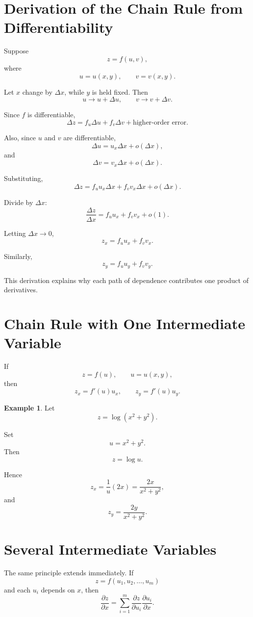 \documentclass[11pt,oneside]{book}
\theoremstyle{studentthm}
\theoremstyle{definition}
\newtheorem{example}[theorem]{Example}
\begin{document}
\section{Derivation of the Chain Rule from Differentiability}

Suppose
\[
z=f(u,v),
\]
where
\[
u=u(x,y),
\qquad
v=v(x,y).
\]

Let \(x\) change by \(\Delta x\), while \(y\) is held fixed. Then
\[
u\to u+\Delta u,
\qquad
v\to v+\Delta v.
\]

Since \(f\) is differentiable,
\[
\Delta z
=
f_u\Delta u
+
f_v\Delta v
+
\text{higher-order error}.
\]

Also, since \(u\) and \(v\) are differentiable,
\[
\Delta u
=
u_x\Delta x
+
o(\Delta x),
\]
and
\[
\Delta v
=
v_x\Delta x
+
o(\Delta x).
\]

Substituting,
\[
\Delta z
=
f_u u_x\Delta x
+
f_v v_x\Delta x
+
o(\Delta x).
\]

Divide by \(\Delta x\):
\[
\frac{\Delta z}{\Delta x}
=
f_u u_x
+
f_v v_x
+
o(1).
\]

Letting \(\Delta x\to0\),
\[
z_x
=
f_u u_x
+
f_v v_x.
\]

Similarly,
\[
z_y
=
f_u u_y
+
f_v v_y.
\]

This derivation explains why each path of dependence contributes one
product of derivatives.

\section{Chain Rule with One Intermediate Variable}

If
\[
z=f(u),
\qquad
u=u(x,y),
\]
then
\[
z_x=f'(u)u_x,
\qquad
z_y=f'(u)u_y.
\]

\begin{example}
Let
\[
z=\log(x^2+y^2).
\]

Set
\[
u=x^2+y^2.
\]
Then
\[
z=\log u.
\]

Hence
\[
z_x
=
\frac1u(2x)
=
\frac{2x}{x^2+y^2},
\]
and
\[
z_y
=
\frac{2y}{x^2+y^2}.
\]
\end{example}

\section{Several Intermediate Variables}

The same principle extends immediately. If
\[
z=f(u_1,u_2,\ldots,u_m)
\]
and each \(u_i\) depends on \(x\), then
\[
\frac{\partial z}{\partial x}
=
\sum_{i=1}^m
\frac{\partial z}{\partial u_i}
\frac{\partial u_i}{\partial x}.
\]
\end{document}
